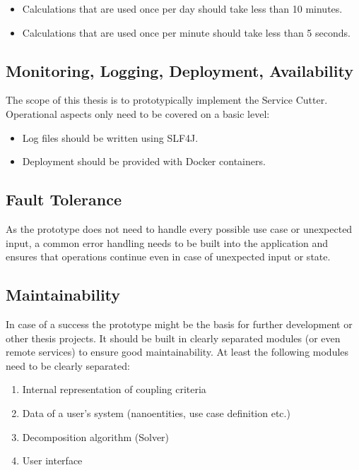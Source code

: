 \begin{itemize}
\item Calculations that are used once per day should take less than 10 minutes.
\item Calculations that are used once per minute should take less than 5 seconds.
\end{itemize}

\subsection{Monitoring, Logging, Deployment, Availability}

The scope of this thesis is to prototypically implement the Service Cutter. Operational aspects only need to be covered on a basic level:

\begin{itemize}
	\item Log files should be written using SLF4J\cite{slf4j}.
	\item Deployment should be provided with Docker\cite{docker} containers.
\end{itemize} 

\subsection{Fault Tolerance}

As the prototype does not need to handle every possible use case or unexpected input, a common error handling needs to be built into the application and ensures that operations continue even in case of unexpected input or state.

\subsection{Maintainability}

In case of a success the prototype might be the basis for further development or other thesis projects. It should be built in clearly separated modules (or even remote services) to ensure good maintainability. At least the following modules need to be clearly separated:


\begin{enumerate}
	\item Internal representation of coupling criteria
	\item Data of a user's system (nanoentities, use case definition etc.) 
	\item Decomposition algorithm (Solver)
	\item User interface
\end{enumerate}

